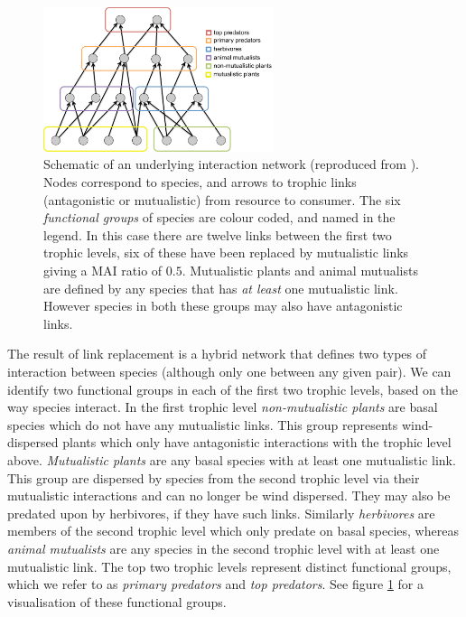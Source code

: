 \begin{figure}
	\centering
	\includegraphics[width=0.6\textwidth]{"diagrams/trophic_cartoon"}
	\caption[Schematic of interaction network, with mutualism.]{Schematic of an underlying interaction network (reproduced from \cite{lurgi2015effects}). Nodes correspond to species, and arrows to trophic links (antagonistic or mutualistic) from resource to consumer. The six \emph{functional groups} of species are colour coded, and named in the legend. In this case there are twelve links between the first two trophic levels, six of these have been replaced by mutualistic links giving a MAI ratio of $0.5$. Mutualistic plants and animal mutualists are defined by any species that has \emph{at least} one mutualistic link. However species in both these groups may also have antagonistic links.}
	\label{fig:trophic_cartoon}
\end{figure}

The result of link replacement is a hybrid network that defines two types of interaction between species (although only one between any given pair). We can identify two functional groups in each of the first two trophic levels, based on the way species interact. In the first trophic level \emph{non-mutualistic plants} are basal species which do not have any mutualistic links. This group represents wind-dispersed plants which only have antagonistic interactions with the trophic level above. \emph{Mutualistic plants} are any basal species with at least one mutualistic link. This group are dispersed by species from the second trophic level via their mutualistic interactions and can no longer be wind dispersed. They may also be predated upon by herbivores, if they have such links. Similarly \emph{herbivores} are members of the second trophic level which only predate on basal species, whereas \emph{animal mutualists} are any species in the second trophic level with at least one mutualistic link. The top two trophic levels represent distinct functional groups, which we refer to as \emph{primary predators} and \emph{top predators}. See figure \ref{fig:trophic_cartoon} for a visualisation of these functional groups. 

